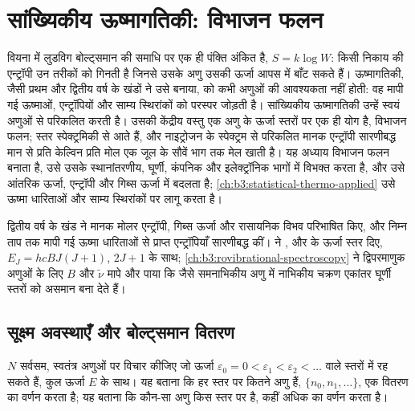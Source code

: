 \chapter{सांख्यिकीय ऊष्मागतिकी: विभाजन फलन}\label{ch:b3:partition-functions}

वियना में लुडविग बोल्ट्समान की समाधि पर एक ही पंक्ति अंकित है, $S = k\log W$: किसी
निकाय की एन्ट्रॉपी उन तरीकों को गिनती है जिनसे उसके अणु उसकी ऊर्जा आपस में बाँट सकते हैं।
ऊष्मागतिकी, जैसी प्रथम और द्वितीय वर्ष के खंडों ने उसे बनाया, को कभी
अणुओं की आवश्यकता नहीं होती: वह मापी गई ऊष्माओं, एन्ट्रॉपियों और साम्य स्थिरांकों को
परस्पर जोड़ती है। सांख्यिकीय ऊष्मागतिकी उन्हें स्वयं अणुओं से परिकलित करती है।
उसकी केंद्रीय वस्तु एक अणु के ऊर्जा स्तरों पर एक ही योग है, विभाजन फलन;
स्तर स्पेक्ट्रमिकी से आते हैं, और नाइट्रोजन के स्पेक्ट्रम से परिकलित मानक एन्ट्रॉपी
सारणीबद्ध मान से प्रति केल्विन प्रति मोल एक जूल के सौवें भाग तक मेल खाती है। यह अध्याय
विभाजन फलन बनाता है, उसे उसके स्थानांतरणीय, घूर्णी,
कंपनिक और इलेक्ट्रॉनिक भागों में विभक्त करता है, और उसे आंतरिक ऊर्जा, एन्ट्रॉपी
और गिब्स ऊर्जा में बदलता है; \cref{ch:b3:statistical-thermo-applied} उसे ऊष्मा
धारिताओं और साम्य स्थिरांकों पर लागू करता है।

\begin{recall}
द्वितीय वर्ष के खंड ने मानक मोलर एन्ट्रॉपी, गिब्स ऊर्जा और
रासायनिक विभव परिभाषित किए, और निम्न ताप तक मापी गई ऊष्मा धारिताओं से प्राप्त
एन्ट्रॉपियाँ सारणीबद्ध कीं।  ने ,
 और  के ऊर्जा स्तर दिए, $E_J = hcBJ(J+1)$,  $2J + 1$ के साथ;
\cref{ch:b3:rovibrational-spectroscopy} ने द्विपरमाणुक
अणुओं के लिए $B$ और $\tilde\nu$ मापे और पाया कि  जैसे समनाभिकीय अणु में
नाभिकीय चक्रण एकांतर घूर्णी स्तरों को असमान बना देते हैं।
\end{recall}

\section{सूक्ष्म अवस्थाएँ और बोल्ट्समान वितरण}

$N$ सर्वसम, स्वतंत्र अणुओं पर विचार कीजिए जो ऊर्जा
$\varepsilon_0 = 0 < \varepsilon_1 < \varepsilon_2 < \dots$ वाले स्तरों में रह सकते हैं, कुल ऊर्जा $E$ के साथ। यह बताना कि हर स्तर पर कितने
अणु हैं, $\{n_0, n_1, \dots\}$, एक वितरण का वर्णन करता है;
यह बताना कि कौन-सा अणु किस स्तर पर है, कहीं अधिक का वर्णन करता है।

